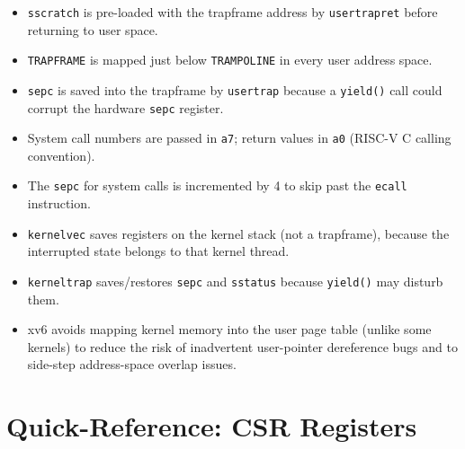 \documentclass[11pt, a4paper]{article}
\begin{document}
\begin{tcolorbox}[impldetail]
\begin{itemize}[leftmargin=1.5em, itemsep=0.2em]
  \item \lstinline|sscratch| is pre-loaded with the trapframe address by \lstinline|usertrapret| before returning to user space.
  \item \lstinline|TRAPFRAME| is mapped just below \lstinline|TRAMPOLINE| in every user address space.
  \item \lstinline|sepc| is saved into the trapframe by \lstinline|usertrap| because a \lstinline|yield()| call could corrupt the hardware \lstinline|sepc| register.
  \item System call numbers are passed in \lstinline|a7|; return values in \lstinline|a0| (RISC-V C calling convention).
  \item The \lstinline|sepc| for system calls is incremented by 4 to skip past the \lstinline|ecall| instruction.
  \item \lstinline|kernelvec| saves registers on the kernel stack (not a trapframe), because the interrupted state belongs to that kernel thread.
  \item \lstinline|kerneltrap| saves/restores \lstinline|sepc| and \lstinline|sstatus| because \lstinline|yield()| may disturb them.
  \item xv6 avoids mapping kernel memory into the user page table (unlike some kernels) to reduce the risk of inadvertent user-pointer dereference bugs and to side-step address-space overlap issues.
\end{itemize}
\end{tcolorbox}

\section{Quick-Reference: CSR Registers}
\end{document}
